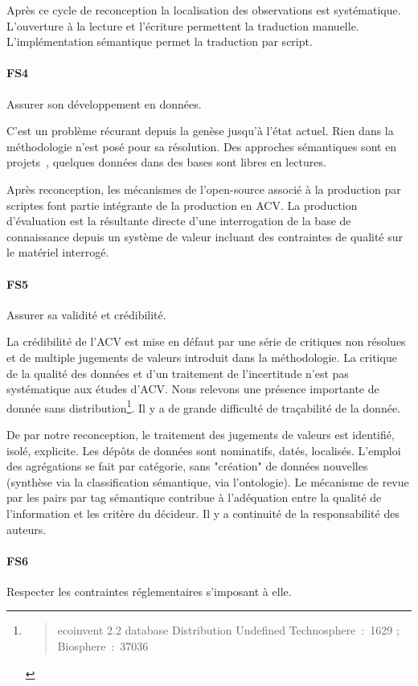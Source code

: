 Après ce cycle de reconception la localisation des observations est systématique.
L'ouverture à la lecture et l'écriture permettent la traduction manuelle.
L'implémentation sémantique permet la traduction par script.
 
\paragraph{FS4} 
Assurer son développement en données.

C'est un problème récurant depuis la genèse jusqu'à l'état actuel.
Rien dans la méthodologie n'est posé pour sa résolution.
Des approches sémantiques sont en projets~\cite{weidema_bonsai_2014,vardeman_ontology_2015}, quelques données dans des bases sont libres en lectures.
 
Après reconception, les mécanismes de l’open-source associé à la production par scriptes font partie intégrante de la production en ACV.
La production d'évaluation est la résultante directe d'une interrogation de la base de connaissance depuis un système de valeur incluant des contraintes de qualité sur le matériel interrogé.


\paragraph{FS5} 
Assurer sa validité et crédibilité. 

La crédibilité de l'ACV est mise en défaut par une série de critiques non résolues et de multiple jugements de valeurs introduit dans la méthodologie.
La critique de la qualité des données et d'un traitement de l'incertitude n'est pas systématique aux études d'ACV.
Nous relevons une présence importante de donnée sans distribution\footnote{\blockcquote{mutel_why_2013}{ecoinvent 2.2 database Distribution Undefined	Technosphere~:~1629 ; Biosphere~:~37036}}.
Il y a de grande difficulté de traçabilité de la donnée.
 
De par notre reconception, le traitement des jugements de valeurs est identifié, isolé, explicite.
Les dépôts de données sont nominatifs, datés, localisés.
L'emploi des agrégations se fait par catégorie, sans "création" de données nouvelles (synthèse via la classification sémantique, via l'ontologie).
Le mécanisme de revue par les pairs par tag sémantique contribue à l'adéquation entre la qualité de l'information et les critère du décideur.
Il y a continuité de la responsabilité des auteurs.


\paragraph{FS6} 
Respecter les contraintes réglementaires s'imposant à elle.


